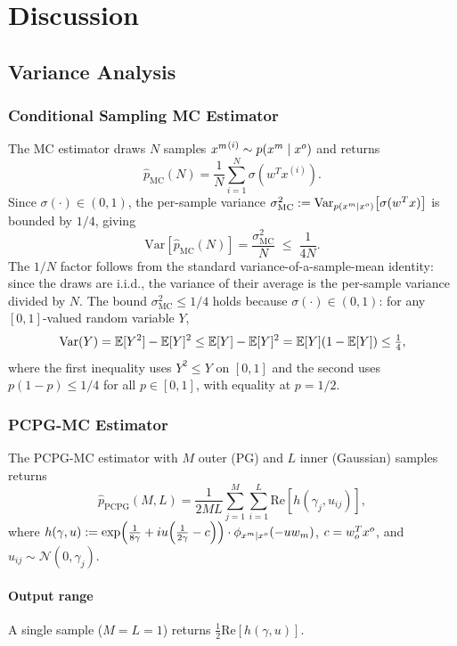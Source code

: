 \chapter{Discussion}
\label{cha:discussion}

\section{Variance Analysis}

\subsection{Conditional Sampling MC Estimator}

The MC estimator draws $N$ samples ${x^m}^{(i)} \sim p(x^m \mid x^o)$ and returns
\[
  \widehat{p}_{\mathrm{MC}}(N) = \frac{1}{N}\sum_{i=1}^{N} \sigma\!\left(w^T x^{(i)}\right).
\]
Since $\sigma(\cdot) \in (0,1)$, the per-sample variance $\sigma^2_{\mathrm{MC}}
:= \mathrm{Var}_{p(x^m\mid x^o)}\!\left[\sigma(w^T x)\right]$ is bounded by $1/4$,
giving
\[
  \mathrm{Var}\!\left[\widehat{p}_{\mathrm{MC}}(N)\right]
  = \frac{\sigma^2_{\mathrm{MC}}}{N}
  \;\leq\; \frac{1}{4N}.
\]
The $1/N$ factor follows from the standard variance-of-a-sample-mean identity:
since the draws are i.i.d., the variance of their average is the per-sample
variance divided by $N$.
The bound $\sigma^2_{\mathrm{MC}} \leq 1/4$ holds because $\sigma(\cdot) \in (0,1)$:
for any $[0,1]$-valued random variable $Y$,
\[
  \mathrm{Var}(Y) = \mathbb{E}[Y^2] - \mathbb{E}[Y]^2 \leq \mathbb{E}[Y] - \mathbb{E}[Y]^2 = \mathbb{E}[Y](1-\mathbb{E}[Y]) \leq \tfrac{1}{4},
\]
where the first inequality uses $Y^2 \leq Y$ on $[0,1]$ and the second uses
$p(1-p) \leq 1/4$ for all $p \in [0,1]$, with equality at $p = 1/2$.

\subsection{PCPG-MC Estimator}

The PCPG-MC estimator with $M$ outer (PG) and $L$ inner (Gaussian) samples returns
\[
  \widehat{p}_{\mathrm{PCPG}}(M,L)
  = \frac{1}{2ML}\sum_{j=1}^{M}\sum_{i=1}^{L}
    \mathrm{Re}\!\left[h(\gamma_j, u_{ij})\right],
\]
where
$h(\gamma, u) := \exp\!\left(\tfrac{1}{8\gamma} + iu\!\left(\tfrac{1}{2\gamma}-c\right)\right)
\cdot \phi_{x^m\mid x^o}(-uw_m)$,
$c = w_o^Tx^o$, and $u_{ij} \sim \mathcal{N}(0,\gamma_j)$.

\subsubsection{Output range}
A single sample ($M{=}L{=}1$) returns $\tfrac{1}{2}\mathrm{Re}[h(\gamma,u)]$.

